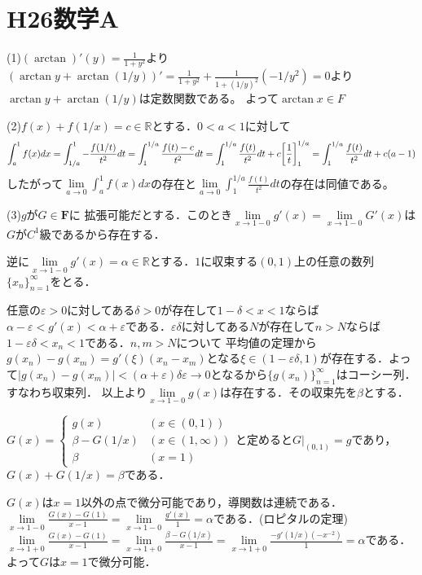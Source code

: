 \documentclass[
		book,
		head_space=20mm,
		foot_space=20mm,
		gutter=10mm,
		line_length=190mm
]{jlreq}
\begin{document}
\section{H26数学A}
(1)$(\arctan)'(y)=\frac{1}{1+y^2}$より
$(\arctan y+\arctan (1/y))'=\frac{1}{1+y^2}+\frac{1}{1+(1/y)^2}(-1/y^2)=0$より
$\arctan y+\arctan (1/y)$は定数関数である。
よって$\arctan x \in F$

(2)$f(x)+f(1/x)=c \in \mathbb{R}$とする．$0<a<1$に対して
\begin{align}
	\int_a^1 f(x)dx=\int_{1/a}^1 -\frac{f(1/t)}{t^2}dt
	=\int_1^{1/a} \frac{f(t)-c}{t^2}dt=\int_1^{1/a} \frac{f(t)}{t^2}dt+c\qty[\frac{1}{t}]_1^{1/a}=\int_1^{1/a} \frac{f(t)}{t^2}dt+c(a-1)
\end{align}
したがって$\lim\limits_{a\to 0}\int_a^1 f(x)dx$の存在と$\lim\limits_{a\to 0}\int_1^{1/a} \frac{f(t)}{t^2}dt$の存在は同値である。

(3)$g$が$G \in \mathbf{F}$に 拡張可能だとする．このとき$\lim\limits_{x\to 1-0}g'(x)=\lim\limits_{x\to 1-0}G'(x)$は$G$が$C^1$級であるから存在する．

逆に$\lim\limits_{x\to 1-0}g'(x)=\alpha\in \mathbb{R}$とする．$1$に収束する$(0,1)$上の任意の数列$\{x_n\}_{n=1}^\infty$をとる．

任意の$\varepsilon>0$に対してある$\delta>0$が存在して$1-\delta<x<1$ならば$\alpha-\varepsilon<g'(x)<\alpha+\varepsilon$である．$\varepsilon\delta$に対してある$N$が存在して$n>N$ならば$1-\varepsilon\delta<x_n<1$である．$n,m>N$について
平均値の定理から$g(x_n)-g(x_m)=g'(\xi)(x_n-x_m)$となる$\xi\in (1-\varepsilon\delta,1)$が存在する．よって$|g(x_n)-g(x_m)|<(\alpha+\varepsilon)\delta\varepsilon\rightarrow0$となるから$\{g(x_n)\}_{n=1}^\infty$はコーシー列．すなわち収束列．
以上より$\lim\limits_{x\to 1-0}g(x)$は存在する．その収束先を$\beta$とする．

$G(x)=\begin{cases}
	g(x) & (x\in (0,1))\\
	\beta -G(1/x) & (x\in (1,\infty))\\
	\beta & (x=1)
	\end{cases}$と定めると$G|_{(0,1)}=g$であり，$G(x)+G(1/x)=\beta$である．

$G(x)$は$x=1$以外の点で微分可能であり，導関数は連続である．
$\lim\limits_{x\to 1-0}\frac{G(x)-G(1)}{x-1}=\lim\limits_{x\to 1-0}\frac{g'(x)}{1}=\alpha$である．(ロピタルの定理)
$\lim\limits_{x\to 1+0} \frac{G(x)-G(1)}{x-1}=\lim\limits_{x\to 1+0} \frac{\beta-G(1/x)}{x-1}=\lim\limits_{x\to 1+0} \frac{-g'(1/x)(-x^{-2})}{1}=\alpha$である．よって$G$は$x=1$で微分可能．
\end{document}

